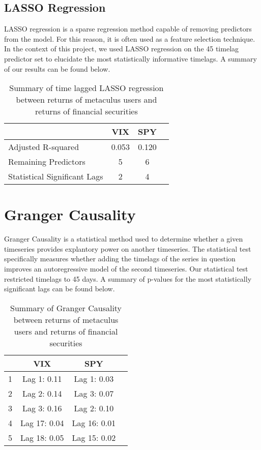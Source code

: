 \documentclass{article}
\begin{document}
\subsection*{LASSO Regression}

LASSO regression is a sparse regression method capable of removing predictors from the model. For this reason, it is often used as a feature selection technique. In the context of this project, we used LASSO regression on the 45 timelag predictor set to elucidate the most statistically informative timelags. A summary of our results can be found below. 


\begin{table}[h]
    \centering
\begin{tabular}{l||ccc}
    \toprule
     & \textbf{VIX} & \textbf{SPY} & \\
    \midrule
    Adjusted R-squared & 0.053 & 0.120 \\
    Remaining Predictors & 5 & 6\\
    Statistical Significant Lags & 2 & 4\\
    \bottomrule
\end{tabular}
\caption{Summary of time lagged LASSO regression between returns of metaculus users and returns of financial securities}
\end{table}

\section*{Granger Causality}

Granger Causality is a statistical method used to determine whether a given timeseries provides explantory power on another timeseries. The statistical test specifically measures whether adding the timelags of the series in question improves an autoregressive model of the second timeseries. Our statistical test restricted timelags to 45 days. A summary of p-values for the most statistically significant lags can be found below.

\begin{table}[h]
    \centering
\begin{tabular}{l||ccc}
    \toprule
     & \textbf{VIX} & \textbf{SPY} & \\
    \midrule
    1 & Lag 1: 0.11 & Lag 1: 0.03 \\
    2 & Lag 2: 0.14 & Lag 3: 0.07\\
    3 & Lag 3: 0.16 & Lag 2: 0.10\\
    4 & Lag 17: 0.04 & Lag 16: 0.01\\
    5 & Lag 18: 0.05 & Lag 15: 0.02\\
    \bottomrule
\end{tabular}
\caption{Summary of Granger Causality between returns of metaculus users and returns of financial securities}
\end{table}
\end{document}
